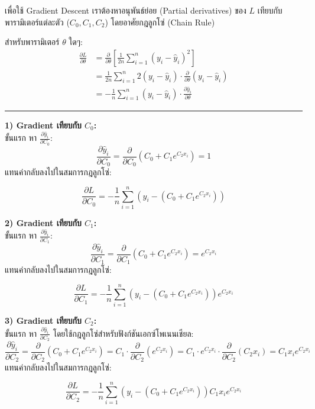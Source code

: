 \documentclass[12pt,a4paper]{article}
\begin{document}
เพื่อใช้ Gradient Descent เราต้องหาอนุพันธ์ย่อย (Partial derivatives) ของ $L$ เทียบกับพารามิเตอร์แต่ละตัว ($C_0, C_1, C_2$) โดยอาศัยกฎลูกโซ่ (Chain Rule)

สำหรับพารามิเตอร์ $\theta$ ใดๆ:
\begin{align*}
  \frac{\partial L}{\partial \theta} &= \frac{\partial}{\partial \theta} \left[ \frac{1}{2n} \sum_{i=1}^{n} \left( y_i - \hat{y}_i \right)^2 \right] \\
  &= \frac{1}{2n} \sum_{i=1}^{n} 2\left( y_i - \hat{y}_i \right) \cdot \frac{\partial}{\partial \theta}\left( y_i - \hat{y}_i \right) \\
  &= -\frac{1}{n} \sum_{i=1}^{n} \left( y_i - \hat{y}_i \right) \cdot \frac{\partial \hat{y}_i}{\partial \theta}
\end{align*}

\noindent\rule{\textwidth}{0.1pt}\vspace{4pt}

\textbf{1) Gradient เทียบกับ $C_0$:} \\
ขั้นแรก หา $\frac{\partial \hat{y}_i}{\partial C_0}$:
\[
  \frac{\partial \hat{y}_i}{\partial C_0} = \frac{\partial}{\partial C_0}\left( C_0 + C_1 e^{C_2 x_i} \right) = 1
\]
แทนค่ากลับลงไปในสมการกฎลูกโซ่:
\begin{ansbox}
\[
  \frac{\partial L}{\partial C_0} = -\frac{1}{n} \sum_{i=1}^{n} \left( y_i - (C_0 + C_1 e^{C_2 x_i}) \right)
\]
\end{ansbox}

\textbf{2) Gradient เทียบกับ $C_1$:} \\
ขั้นแรก หา $\frac{\partial \hat{y}_i}{\partial C_1}$:
\[
  \frac{\partial \hat{y}_i}{\partial C_1} = \frac{\partial}{\partial C_1}\left( C_0 + C_1 e^{C_2 x_i} \right) = e^{C_2 x_i}
\]
แทนค่ากลับลงไปในสมการกฎลูกโซ่:
\begin{ansbox}
\[
  \frac{\partial L}{\partial C_1} = -\frac{1}{n} \sum_{i=1}^{n} \left( y_i - (C_0 + C_1 e^{C_2 x_i}) \right) e^{C_2 x_i}
\]
\end{ansbox}

\textbf{3) Gradient เทียบกับ $C_2$:} \\
ขั้นแรก หา $\frac{\partial \hat{y}_i}{\partial C_2}$ โดยใช้กฎลูกโซ่สำหรับฟังก์ชันเอกซ์โพเนนเชียล:
\[
  \frac{\partial \hat{y}_i}{\partial C_2} = \frac{\partial}{\partial C_2}\left( C_0 + C_1 e^{C_2 x_i} \right) = C_1 \cdot \frac{\partial}{\partial C_2}\left( e^{C_2 x_i} \right) = C_1 \cdot e^{C_2 x_i} \cdot \frac{\partial}{\partial C_2}(C_2 x_i) = C_1 x_i e^{C_2 x_i}
\]
แทนค่ากลับลงไปในสมการกฎลูกโซ่:
\begin{ansbox}
\[
  \frac{\partial L}{\partial C_2} = -\frac{1}{n} \sum_{i=1}^{n} \left( y_i - (C_0 + C_1 e^{C_2 x_i}) \right) C_1 x_i e^{C_2 x_i}
\]
\end{ansbox}
\end{document}
